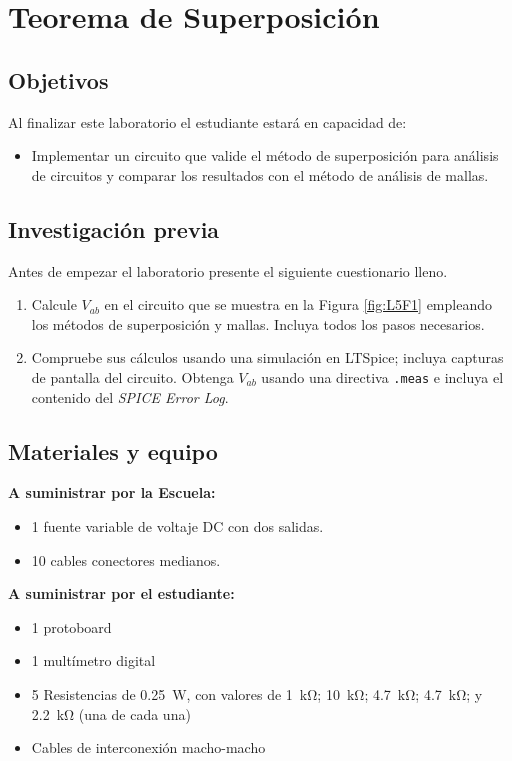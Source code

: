 \documentclass[12pt,letterpaper]{report}
\newcommand{\obj}{Objetivos}
\newcommand{\inv}{Investigación previa}
\newcommand{\mat}{Materiales y equipo}
\newcommand{\capacidad}{Al finalizar este laboratorio el estudiante estará en capacidad de:}
\newcommand{\antesde}{Antes de empezar el laboratorio presente el siguiente cuestionario lleno.}
\begin{document}
\chapter{Teorema de Superposición}

\section{\obj}
\capacidad
\begin{itemize}
\item Implementar un circuito que valide el método de superposición para análisis
de circuitos y comparar los resultados con el método de análisis de mallas.
\end{itemize}

\section{\inv}
\antesde
\begin{enumerate}
\item Calcule $V_{ab}$ en el circuito que se muestra en la Figura \ref{fig:L5F1} empleando los métodos de superposición y mallas. Incluya todos los pasos necesarios.
\item Compruebe sus cálculos usando una simulación en LTSpice; incluya capturas de pantalla del circuito. Obtenga $V_{ab}$ usando una directiva \verb!.meas! e incluya el contenido del \emph{SPICE Error Log}. 
\end{enumerate}

\section{\mat}
\textbf{A suministrar por la Escuela:}
\begin{itemize}
\item 1 fuente variable de voltaje DC con dos salidas.
\item 10 cables conectores medianos.
\end{itemize}
\textbf{A suministrar por el estudiante:}
\begin{itemize} 
\item   1 protoboard
\item   1 multímetro digital
\item 5 Resistencias de \SI{0.25}{\watt}, con valores de \SI{1}{\kilo\ohm}; \SI{10}{\kilo\ohm}; \SI{4.7}{\kilo\ohm}; \SI{4.7}{\kilo\ohm}; y \SI{2.2}{\kilo\ohm} (una de cada una)
\item   Cables de interconexión macho-macho
\end{itemize}
\end{document}
